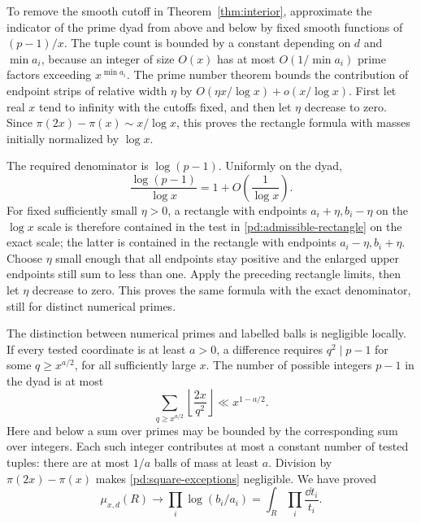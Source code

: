 To remove the smooth cutoff in Theorem~\ref{thm:interior}, approximate
the indicator of the prime dyad from above and below by fixed smooth
functions of $(p-1)/x$.  The tuple count is bounded by a constant
depending on $d$ and $\min a_i$, because an integer of size $O(x)$ has
at most $O(1/\min a_i)$ prime factors exceeding $x^{\min a_i}$.
The prime number theorem bounds the contribution of endpoint strips
of relative width $\eta$ by $O(\eta x/\log x)+o(x/\log x)$.
First let real $x$ tend to infinity with the cutoffs fixed, and then
let $\eta$ decrease to zero.  Since
$\pi(2x)-\pi(x)\sim x/\log x$, this proves the rectangle formula
with masses initially normalized by $\log x$.

The required denominator is $\log(p-1)$.  Uniformly on the dyad,
\begin{equation}\label{pd:denominator}
 \frac{\log(p-1)}{\log x}=1+O\left(\frac1{\log x}\right).
\end{equation}
For fixed sufficiently small $\eta>0$, a rectangle with endpoints
$a_i+\eta,b_i-\eta$ on the $\log x$ scale is therefore contained in
the test in \eqref{pd:admissible-rectangle} on the exact scale;
the latter is contained in the rectangle with endpoints
$a_i-\eta,b_i+\eta$.  Choose $\eta$ small enough that all endpoints
stay positive and the enlarged upper endpoints still sum to less
than one.  Apply the preceding rectangle limits, then let $\eta$
decrease to zero.  This proves the same formula with the exact
denominator, still for distinct numerical primes.

The distinction between numerical primes and labelled balls is
negligible locally.  If every tested coordinate is at least $a>0$,
a difference requires $q^2\mid p-1$ for some $q\geq x^{a/2}$, for
all sufficiently large $x$.  The number of possible integers $p-1$
in the dyad is at most
\begin{equation}\label{pd:square-exceptions}
 \sum_{q\geq x^{a/2}}\left\lfloor\frac{2x}{q^2}\right\rfloor
 \ll x^{1-a/2}.
\end{equation}
Here and below a sum over primes may be bounded by the corresponding
sum over integers.  Each such integer contributes at most a constant
number of tested tuples: there are at most $1/a$ balls of mass at
least $a$.  Division by $\pi(2x)-\pi(x)$ makes
\eqref{pd:square-exceptions} negligible.  We have proved
\begin{equation}\label{pd:rectangle-limit}
 \mu_{x,d}(R)\longrightarrow
 \prod_i\log(b_i/a_i)
 =\int_R\prod_i\frac{\dd t_i}{t_i}.
\end{equation}

